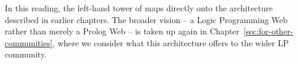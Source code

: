 In this reading, the left-hand tower of \citet{Horrocks2005} maps directly onto the architecture described in earlier chapters. The broader vision -- a Logic Programming Web rather than merely a Prolog Web -- is taken up again in Chapter~\ref{sec:for-other-communities}, where we consider what this architecture offers to the wider LP community.


%
